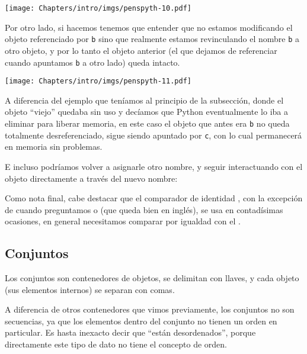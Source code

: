 
\begin{center}
    \texttt{[image: Chapters/intro/imgs/penspyth-10.pdf]}
\end{center}

Por otro lado, si hacemos  tenemos que entender que no estamos modificando el objeto referenciado por \verb|b| sino que realmente estamos revinculando el nombre \verb|b| a otro objeto, y por lo tanto el objeto anterior (el que dejamos de referenciar cuando apuntamos \verb|b| a otro lado) queda intacto. 


\begin{center}
    \texttt{[image: Chapters/intro/imgs/penspyth-11.pdf]}
\end{center}

A diferencia del ejemplo que teníamos al principio de la subsección, donde el objeto ``viejo'' quedaba sin uso y decíamos que Python eventualmente lo iba a eliminar para liberar memoria, en este caso el objeto que antes era \verb|b| no queda totalmente desreferenciado, sigue siendo apuntado por \verb|c|, con lo cual permanecerá en memoria sin problemas.

E incluso podríamos volver a asignarle otro nombre, y seguir interactuando con el objeto directamente a través del nuevo nombre:


Como nota final, cabe destacar que el comparador de identidad , con la excepción de cuando preguntamos  o  (que queda bien en inglés), se usa en contadísimas ocasiones, en general necesitamos comparar por igualdad con el \mip{==}.


\subsection{Conjuntos}

Los conjuntos son contenedores de objetos, se delimitan con llaves, y cada objeto (sus elementos internos) se separan con comas.

A diferencia de otros contenedores que vimos previamente, los conjuntos no son secuencias, ya que los elementos dentro del conjunto no tienen un orden en particular. Es hasta inexacto decir que ``están desordenados'', porque directamente este tipo de dato no tiene el concepto de orden.

